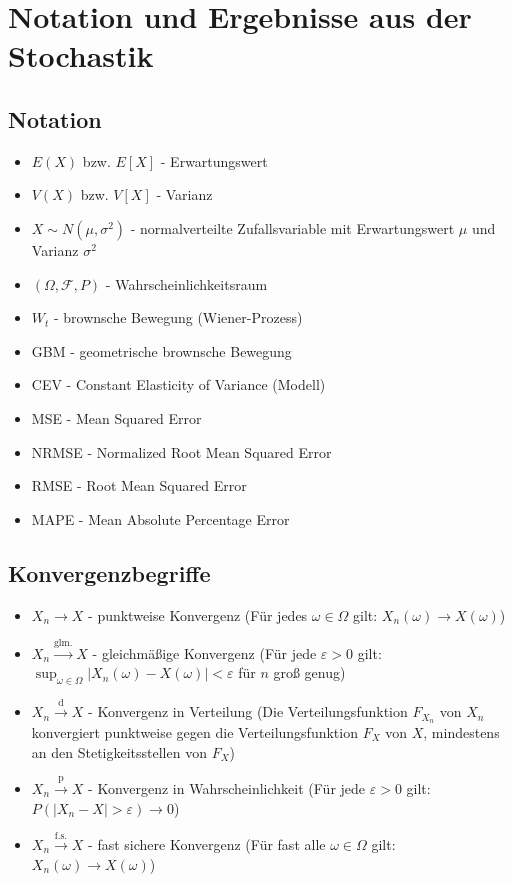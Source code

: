 \section{Notation und Ergebnisse aus der Stochastik}
\subsection{Notation}
\begin{itemize}
    \item $E(X)$ bzw. $E[X]$ - Erwartungswert
    \item $V(X)$ bzw. $V[X]$ - Varianz
    \item $X \sim N(\mu, \sigma^2)$ - normalverteilte Zufallsvariable mit Erwartungswert $\mu$ und Varianz $\sigma^2$
    \item $(\Omega, \mathcal F, P)$ - Wahrscheinlichkeitsraum
    \item $W_t$ - brownsche Bewegung (Wiener-Prozess)
    \item GBM - geometrische brownsche Bewegung
    \item CEV - Constant Elasticity of Variance (Modell)
    \item MSE - Mean Squared Error
    \item NRMSE - Normalized Root Mean Squared Error
    \item RMSE - Root Mean Squared Error
    \item MAPE - Mean Absolute Percentage Error
\end{itemize}

\subsection{Konvergenzbegriffe}

\begin{itemize}
    \item $X_n \xrightarrow{} X$ - punktweise Konvergenz (Für jedes $\omega \in \Omega$ gilt: $X_n(\omega) \to X(\omega)$)
    \item $X_n \xrightarrow{\mathrm{glm.}} X$ - gleichmäßige Konvergenz (Für jede $\varepsilon > 0$ gilt: $\sup_{\omega \in \Omega} |X_n(\omega) - X(\omega)| < \varepsilon$ für $n$ groß genug)
    \item $X_n \xrightarrow{\mathrm{d}} X$ - Konvergenz in Verteilung (Die Verteilungsfunktion $F_{X_n}$ von $X_n$ konvergiert punktweise gegen die Verteilungsfunktion $F_X$ von $X$, mindestens an den Stetigkeitsstellen von $F_X$)
    \item $X_n \xrightarrow{\mathrm{p}} X$ - Konvergenz in Wahrscheinlichkeit (Für jede $\varepsilon > 0$ gilt: $P(|X_n - X| > \varepsilon) \to 0$)
    \item $X_n \xrightarrow{\mathrm{f.s.}} X$ - fast sichere Konvergenz (Für fast alle $\omega \in \Omega$ gilt: $X_n(\omega) \to X(\omega)$)
\end{itemize}

